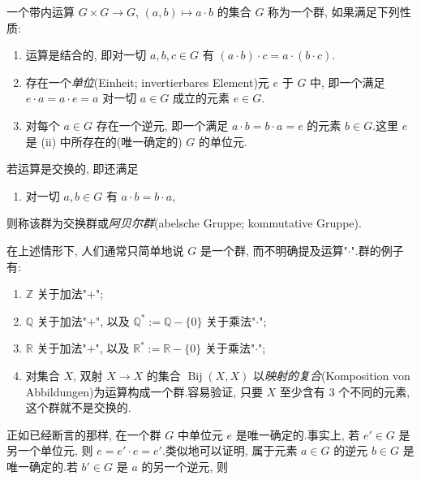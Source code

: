 \begin{definition}[群]\label{def:1.2.1}
一个带内运算 $G \times G \longrightarrow G$, $(a, b) \longmapsto a \cdot b$ 的集合 $G$ 称为一个群, 如果满足下列性质:
\begin{enumerate}
\item[(i)] 运算是结合的, 即对一切 $a, b, c \in G$ 有 $(a \cdot b) \cdot c = a \cdot (b \cdot c)$.
\item[(ii)] 存在一个\emph{单位}(\textup{Einheit; invertierbares Element})元 $e$ 于 $G$ 中, 即一个满足 $e \cdot a = a \cdot e = a$ 对一切 $a \in G$ 成立的元素 $e \in G$.
\item[(iii)] 对每个 $a \in G$ 存在一个逆元, 即一个满足 $a \cdot b = b \cdot a = e$ 的元素 $b \in G$.这里 $e$ 是 (ii) 中所存在的(唯一确定的) $G$ 的单位元.
\end{enumerate}
\end{definition}

若运算是交换的, 即还满足
\begin{enumerate}
\item[(iv)] 对一切 $a, b \in G$ 有 $a \cdot b = b \cdot a$,
\end{enumerate}
则称该群为交换群或\emph{阿贝尔群}(\textup{abelsche Gruppe; kommutative Gruppe}).

在上述情形下, 人们通常只简单地说 $G$ 是一个群, 而不明确提及运算"$\cdot$".群的例子有:
\begin{enumerate}
\item[(1)] $\mathbb{Z}$ 关于加法"$+$";
\item[(2)] $\mathbb{Q}$ 关于加法"$+$", 以及 $\mathbb{Q}^* := \mathbb{Q} - \{0\}$ 关于乘法"$\cdot$";
\item[(3)] $\mathbb{R}$ 关于加法"$+$", 以及 $\mathbb{R}^* := \mathbb{R} - \{0\}$ 关于乘法"$\cdot$";
\item[(4)] 对集合 $X$, 双射 $X \longrightarrow X$ 的集合 $\operatorname{Bij}(X, X)$ 以\emph{映射的复合}(\textup{Komposition von Abbildungen})为运算构成一个群.容易验证, 只要 $X$ 至少含有 $3$ 个不同的元素, 这个群就不是交换的.
\end{enumerate}

正如已经断言的那样, 在一个群 $G$ 中单位元 $e$ 是唯一确定的.事实上, 若 $e' \in G$ 是另一个单位元, 则 $e = e' \cdot e = e'$.类似地可以证明, 属于元素 $a \in G$ 的逆元 $b \in G$ 是唯一确定的.若 $b' \in G$ 是 $a$ 的另一个逆元, 则

